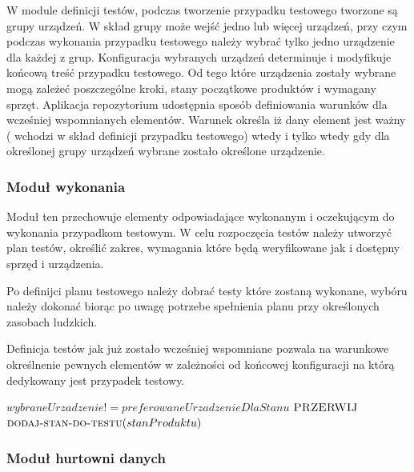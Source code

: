 W module definicji testów, podczas tworzenie przypadku testowego tworzone są grupy urządzeń. W skład grupy może wejść jedno lub więcej urządzeń, przy czym podczas wykonania przypadku testowego należy wybrać tylko jedno urządzenie dla każdej z grup. Konfiguracja wybranych urządzeń determinuje i modyfikuje końcową treść przypadku testowego. Od tego które urządzenia zostały wybrane mogą zależeć poszczególne kroki, stany początkowe produktów i wymagany sprzęt. Aplikacja repozytorium udostępnia sposób definiowania warunków dla wcześniej wspomnianych elementów. Warunek określa iż dany element jest ważny ( wchodzi w skład definicji przypadku testowego) wtedy i tylko wtedy gdy dla określonej grupy urządzeń wybrane zostało określone urządzenie.



\subsubsection{Moduł wykonania }

Moduł ten przechowuje elementy odpowiadające wykonanym i oczekującym do wykonania przypadkom testowym. W celu rozpoczęcia testów należy utworzyć plan testów, określić zakres, wymagania które będą weryfikowane jak i dostępny sprzęd i urządzenia.

Po definijci planu testowego należy dobrać testy które zostaną wykonane, wybóru należy dokonać biorąc po uwagę potrzebe spełnienia planu przy określonych zasobach ludzkich.

Definicja testów jak już zostało wcześniej wspomniane pozwala na warunkowe określnenie pewnych elementów w zależności od końcowej konfiguracji na którą dedykowany jest przypadek testowy.

	\begin{codebox}
	\li {}
	\li \Do   
	\li \Do
	     \If $wybraneUrzadzenie  !=  preferowaneUrzadzenieDlaStanu$
	\li     \Then
	          $\textnormal{\scshape PRZERWIJ}$
	          \Else
	          $\textnormal{\scshape dodaj-stan-do-testu}(stanProduktu)$
	        \End
	        
	\li  \End
	 
	\li
	  \End
	\end{codebox}

\subsubsection{Moduł hurtowni danych  }


